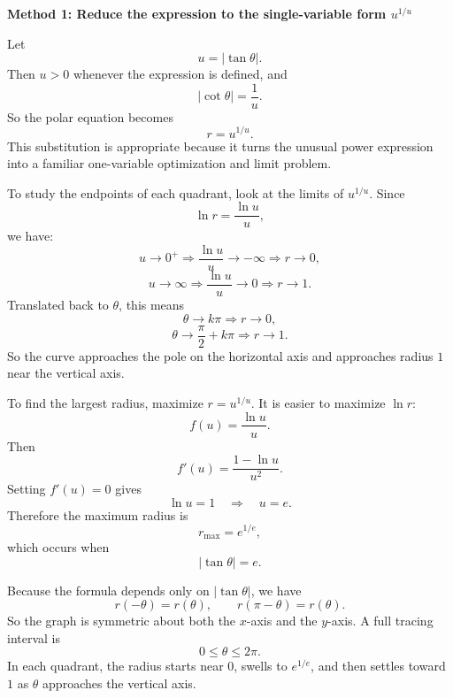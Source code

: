 \documentclass[a4paper,12pt,twocolumn]{article}
\newenvironment{solutionbox}{\begin{framed}}{\end{framed}}
\begin{document}
\begin{solutionbox}
\textbf{Method 1: Reduce the expression to the single-variable form \(u^{1/u}\)}

\begin{steps}
\item Let
\[
u=\lvert\tan\theta\rvert.
\]
Then \(u>0\) whenever the expression is defined, and
\[
\lvert\cot\theta\rvert=\frac{1}{u}.
\]
So the polar equation becomes
\[
r=u^{1/u}.
\]
This substitution is appropriate because it turns the unusual power expression into a familiar one-variable optimization and limit problem.

\item To study the endpoints of each quadrant, look at the limits of \(u^{1/u}\). Since
\[
\ln r=\frac{\ln u}{u},
\]
we have:
\[
u\to 0^+ \Longrightarrow \frac{\ln u}{u}\to-\infty \Longrightarrow r\to 0,
\]
\[
u\to\infty \Longrightarrow \frac{\ln u}{u}\to 0 \Longrightarrow r\to 1.
\]
Translated back to \(\theta\), this means
\[
\theta\to k\pi \Longrightarrow r\to 0,
\]
\[
\theta\to \frac{\pi}{2}+k\pi \Longrightarrow r\to 1.
\]
So the curve approaches the pole on the horizontal axis and approaches radius \(1\) near the vertical axis.

\item To find the largest radius, maximize \(r=u^{1/u}\). It is easier to maximize \(\ln r\):
\[
f(u)=\frac{\ln u}{u}.
\]
Then
\[
f'(u)=\frac{1-\ln u}{u^2}.
\]
Setting \(f'(u)=0\) gives
\[
\ln u=1
\quad\Longrightarrow\quad
u=e.
\]
Therefore the maximum radius is
\[
r_{\max}=e^{1/e},
\]
which occurs when
\[
\lvert\tan\theta\rvert=e.
\]

\item Because the formula depends only on \(\lvert\tan\theta\rvert\), we have
\[
r(-\theta)=r(\theta),
\qquad
r(\pi-\theta)=r(\theta).
\]
So the graph is symmetric about both the \(x\)-axis and the \(y\)-axis. A full tracing interval is
\[
0\le \theta\le 2\pi.
\]
In each quadrant, the radius starts near \(0\), swells to \(e^{1/e}\), and then settles toward \(1\) as \(\theta\) approaches the vertical axis.
\end{steps}
\end{solutionbox}
\end{document}
